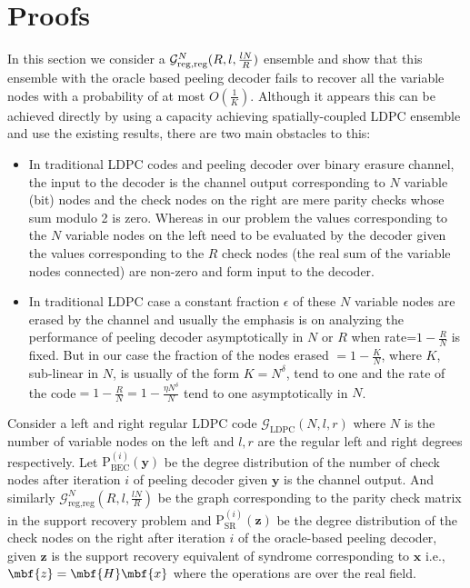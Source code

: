 \documentclass[conference]{IEEEtran}
\begin{document}
\section{Proofs}
In this section we consider a $\mathcal{G}^{N}_{\rm reg,reg}(R,l,\frac{lN}{R})$ ensemble and show that this ensemble with the oracle based peeling decoder fails to recover all the variable nodes with a probability of at most $O\left(\frac{1}{K}\right)$. Although it appears this can be achieved directly by using a capacity achieving spatially-coupled LDPC ensemble and use the existing results, there are two main obstacles to this:
\begin{itemize}
\item  In traditional LDPC codes and peeling decoder over binary erasure channel, the input to the decoder is the channel output corresponding to $N$ variable (bit) nodes and the check nodes on the right are mere parity checks whose sum modulo 2 is zero. Whereas in our problem the values corresponding to the $N$ variable nodes on the left need to be evaluated by the decoder given the values corresponding to the $R$ check nodes (the real sum of the variable nodes connected) are non-zero  and form input to the decoder.
\item  In traditional LDPC case a constant fraction $\epsilon$ of these $N$ variable nodes are erased by the channel and usually the emphasis is on analyzing the performance of peeling decoder asymptotically in $N$ or $R$ when rate=$1-\frac{R}{N}$ is fixed. But in our case the fraction of the nodes erased $=1-\frac{K}{N}$, where $K$, sub-linear in $N$, is usually of the form $K=N^{\delta}$, tend to one and the rate of the code$=1-\frac{R}{N}=1-\frac{\eta N^{\delta}}{N}$ tend to one asymptotically in $N$.
\end{itemize}
\vspace{1ex}

Consider a left and right regular LDPC code $\mathcal{G}_{\text{LDPC}}(N,l,r)$ where $N$ is the number of variable nodes on the left and $l,r$ are the regular left and right degrees respectively. Let $\text{P}_{\text{BEC}}^{(i)}(\mathbf{y})$ be the degree distribution of the number of check nodes after iteration $i$ of peeling decoder given $\mathbf{y}$ is the channel output. And similarly $\mathcal{G}^{N}_{\text{reg,reg}}(R,l,\frac{lN}{R})$ be the graph corresponding to the parity check matrix in the support recovery problem and $\text{P}_{\text{SR}}^{(i)}(\mathbf{z})$ be the degree distribution of the check nodes on the right after iteration $i$ of the oracle-based peeling decoder, given $\mathbf{z}$ is the support recovery equivalent of syndrome corresponding to $\mathbf{x}$ i.e., $\mbf{z}=\mbf{H}\mbf{x}$ where the operations are over the real field.
\end{document}
